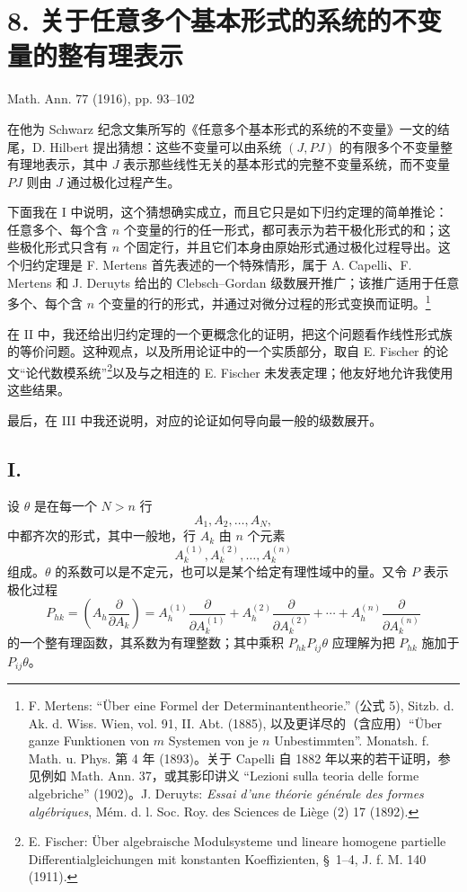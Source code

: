 \section*{8. 关于任意多个基本形式的系统的不变量的整有理表示}
\begin{center}
Math. Ann. 77 (1916), pp. 93--102
\end{center}

在他为 Schwarz 纪念文集所写的《任意多个基本形式的系统的不变量》一文的结尾，D. Hilbert 提出猜想：这些不变量可以由系统 $(J,PJ)$ 的有限多个不变量整有理地表示，其中 $J$ 表示那些线性无关的基本形式的完整不变量系统，而不变量 $PJ$ 则由 $J$ 通过极化过程产生。

下面我在 I 中说明，这个猜想确实成立，而且它只是如下归约定理的简单推论：任意多个、每个含 $n$ 个变量的行的任一形式，都可表示为若干极化形式的和；这些极化形式只含有 $n$ 个固定行，并且它们本身由原始形式通过极化过程导出。这个归约定理是 F. Mertens 首先表述的一个特殊情形，属于 A. Capelli、F. Mertens 和 J. Deruyts 给出的 Clebsch--Gordan 级数展开推广；该推广适用于任意多个、每个含 $n$ 个变量的行的形式，并通过对微分过程的形式变换而证明。\footnote{F. Mertens: ``Über eine Formel der Determinantentheorie.'' (公式 5), Sitzb. d. Ak. d. Wiss. Wien, vol. 91, II. Abt. (1885), 以及更详尽的（含应用）``Über ganze Funktionen von $m$ Systemen von je $n$ Unbestimmten''. Monatsh. f. Math. u. Phys. 第 4 年 (1893)。关于 Capelli 自 1882 年以来的若干证明，参见例如 Math. Ann. 37，或其影印讲义 ``Lezioni sulla teoria delle forme algebriche'' (1902)。J. Deruyts: \emph{Essai d'une théorie générale des formes algébriques}, Mém. d. l. Soc. Roy. des Sciences de Liège (2) 17 (1892).}

在 II 中，我还给出归约定理的一个更概念化的证明，把这个问题看作线性形式族的等价问题。这种观点，以及所用论证中的一个实质部分，取自 E. Fischer 的论文“论代数模系统”\footnote{E. Fischer: Über algebraische Modulsysteme und lineare homogene partielle Differentialgleichungen mit konstanten Koeffizienten, \S\ 1--4, J. f. M. 140 (1911).}以及与之相连的 E. Fischer 未发表定理；他友好地允许我使用这些结果。

最后，在 III 中我还说明，对应的论证如何导向最一般的级数展开。

\subsection*{I.}
设 $\theta$ 是在每一个 $N>n$ 行
\[
  A_1,A_2,\ldots,A_N,
\]
中都齐次的形式，其中一般地，行 $A_k$ 由 $n$ 个元素
\[
  A_k^{(1)},A_k^{(2)},\ldots,A_k^{(n)}
\]
组成。$\theta$ 的系数可以是不定元，也可以是某个给定有理性域中的量。又令 $P$ 表示极化过程
\[
  P_{hk}=\left(A_h\frac{\partial}{\partial A_k}\right)
  =A_h^{(1)}\frac{\partial}{\partial A_k^{(1)}}+
   A_h^{(2)}\frac{\partial}{\partial A_k^{(2)}}+
   \cdots+
   A_h^{(n)}\frac{\partial}{\partial A_k^{(n)}}
\]
的一个整有理函数，其系数为有理整数；其中乘积 $P_{hk}P_{ij}\theta$ 应理解为把 $P_{hk}$ 施加于 $P_{ij}\theta$。

